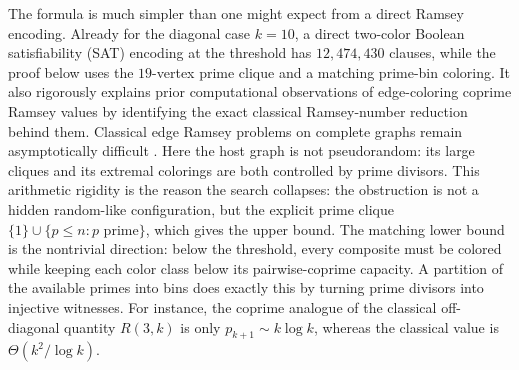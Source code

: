 \documentclass[11pt]{article}
\theoremstyle{plain}
\theoremstyle{definition}
\theoremstyle{remark}
\begin{document}
The formula is much simpler than one might expect from a direct Ramsey
encoding.  Already for the diagonal case $k=10$, a direct two-color Boolean
satisfiability (SAT) encoding at the threshold has $12{,}474{,}430$ clauses,
while the proof below uses the $19$-vertex prime clique and a matching
prime-bin coloring.
It also rigorously explains prior computational observations of edge-coloring
coprime Ramsey values by identifying the exact classical Ramsey-number
reduction behind them.
Classical edge Ramsey problems on complete graphs remain
asymptotically difficult
\cite{ramsey1930,erdos-szekeres1935,campos2023,campos-r3k2025,
ma-shen-xie2025,hunter-milojevic-sudakov2025,campos-pohoata2026,
attwa-lopez-morris2026,nagda2026,przybocki2026}.  Here the host graph is not
pseudorandom: its large cliques and its extremal colorings are both controlled
by prime divisors.  This arithmetic rigidity is the reason the search
collapses: the obstruction is not a hidden random-like configuration, but the
explicit prime clique
$\{1\}\cup\{p\le n:p\text{ prime}\}$, which gives the upper bound.  The matching
lower bound is the nontrivial direction: below the threshold, every composite
must be colored while keeping each color class below its pairwise-coprime
capacity.  A partition of the available primes into bins does exactly this by
turning prime divisors into injective witnesses.
For instance, the coprime analogue of the classical off-diagonal quantity
$R(3,k)$ is only $p_{k+1}\sim k\log k$, whereas the classical value is
$\Theta(k^2/\log k)$.
\end{document}
